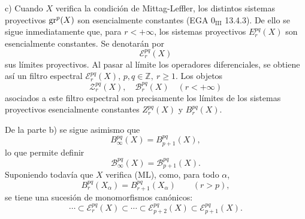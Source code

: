 c) Cuando \(X\) verifica la condición de Mittag-Leffler, los distintos sistemas proyectivos \(\operatorname{gr}^p(X)\) son esencialmente constantes (EGA \(0_{\mathrm{III}}\) 13.4.3). De ello se sigue inmediatamente que, para \(r<+\infty\), los sistemas proyectivos \(E_r^{pq}(X)\) son esencialmente constantes. Se denotarán por
\[
\mathcal E_r^{pq}(X)
\]
sus límites proyectivos. Al pasar al límite los operadores diferenciales, se obtiene así un filtro espectral \(\mathcal E_r^{pq}(X)\), \(p,q\in\mathbb Z,\ r\ge1\). Los objetos
\[
\mathcal Z_r^{pq}(X),\quad \mathcal B_r^{pq}(X)\quad(r<+\infty)
\]
asociados a este filtro espectral son precisamente los límites de los sistemas proyectivos esencialmente constantes \(Z_r^{pq}(X)\) y \(B_r^{pq}(X)\).

De la parte b) se sigue asimismo que
\[
B_\infty^{pq}(X)=B_{p+1}^{pq}(X),
\]
lo que permite definir
\[
\mathcal B_\infty^{pq}(X)=\mathcal B_{p+1}^{pq}(X).
\]
Suponiendo todavía que \(X\) verifica (ML), como, para todo \(\alpha\),
\[
B_r^{pq}(X_\alpha)=B_{r+1}^{pq}(X_\alpha)\qquad(r>p),
\]
se tiene una sucesión de monomorfismos canónicos:
\begin{equation}
\cdots\subset\mathcal E_r^{pq}(X)\subset\cdots\subset\mathcal E_{p+2}^{pq}(X)\subset\mathcal E_{p+1}^{pq}(X).
\tag{S}
\end{equation}
